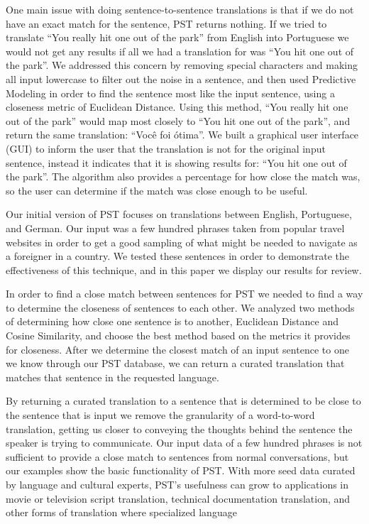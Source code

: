 \documentclass[runningheads]{llncs}
\begin{document}
	One main issue with doing sentence-to-sentence translations is that if we do not have an exact match for the sentence, PST returns nothing. If we tried to translate ``You really hit one out of the park'' from English into Portuguese we would not get any results if all we had a translation for was ``You hit one out of the park''. We addressed this concern by removing special characters and making all input lowercase to filter out the noise in a sentence, and then used Predictive Modeling in order to find the sentence most like the input sentence, using a closeness metric of Euclidean Distance. Using this method, ``You really hit one out of the park'' would map most closely to ``You hit one out of the park'', and return the same translation: ``Você foi ótima''. We built a graphical user interface (GUI) to inform the user that the translation is not for the original input sentence, instead it indicates that it is showing results for: ``You hit one out of the park''. The algorithm also provides a percentage for how close the match was, so the user can determine if the match was close enough to be useful.
	
	Our initial version of PST focuses on translations between English, Portuguese, and German. Our input was a few hundred phrases taken from popular travel websites in order to get a good sampling of what might be needed to navigate as a foreigner in a country. We tested these sentences in order to demonstrate the effectiveness of this technique, and in this paper we display our results for review. 

	In order to find a close match between sentences for PST we needed to find a way to determine the closeness of sentences to each other. We analyzed two  methods of determining how close one sentence is to another, Euclidean Distance and Cosine Similarity, and choose the best method based on the metrics it provides for closeness. After we determine the closest match of an input sentence to one we know through our PST database, we can return a curated translation that matches that sentence in the requested language.

	By returning a curated translation to a sentence that is determined to be close to the sentence that is input we remove the granularity of a word-to-word translation, getting us closer to conveying the thoughts behind the sentence the speaker is trying to communicate. Our input data of a few hundred phrases is not sufficient to provide a close match to sentences from normal conversations, but our examples show the basic functionality of PST. With more seed data curated by language and cultural experts, PST's usefulness can grow to applications in movie or television script translation, technical documentation translation, and other forms of translation where specialized language 
	
\end{document}
